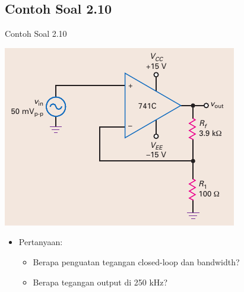 \subsection{Contoh Soal 2.10}
\begin{frame}{Contoh Soal 2.10}
	\begin{multicols}{2}
		\begin{center}
			\includegraphics[width=\linewidth]{gambar/fig-16.22a}
		\end{center}
		\columnbreak
		\begin{itemize}
			\item Pertanyaan:
			\begin{itemize}
				\item Berapa penguatan tegangan closed-loop dan bandwidth?
				\item Berapa tegangan output di 250 kHz?
			\end{itemize}
		\end{itemize}
	\end{multicols}
\end{frame}

